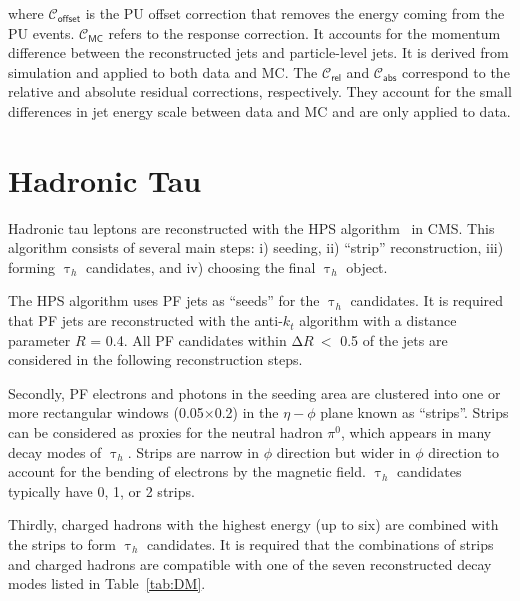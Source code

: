 where $\mathcal{C}_{\textsf{offset}}$ is the \ac{PU} offset correction that removes the energy coming from the \ac{PU} events. $\mathcal{C}_{\textsf{MC}}$ refers to the response correction. It accounts for the momentum difference between the reconstructed jets and particle-level jets. It is derived from simulation and applied to both data and \ac{MC}. The $\mathcal{C}_{\textsf{rel}}$ and $\mathcal{C}_{\textsf{abs}}$ correspond to the relative and absolute residual corrections, respectively. They account for the small differences in jet energy scale between data and \ac{MC} and are only applied to data.

\section{Hadronic Tau}
\label{sec:Tau}

Hadronic tau leptons are reconstructed with the \ac{HPS} algorithm~\cite{CMS:2011eio} in \ac{CMS}. This algorithm consists of several main steps: i) seeding, ii) ``strip'' reconstruction, iii) forming $\uptau_{h}$ candidates, and iv) choosing the final $\uptau_{h}$ object.

The \ac{HPS} algorithm uses \ac{PF} jets as ``seeds'' for the $\uptau_h$ candidates. It is required that \ac{PF} jets are reconstructed with the anti-$k_t$ algorithm with a distance parameter $R$ = 0.4. All \ac{PF} candidates within $\mathrm{\Delta}R~<$ 0.5 of the jets are considered in the following reconstruction steps.

Secondly, \ac{PF} electrons and photons in the seeding area are clustered into one or more rectangular windows (0.05$\times$0.2) in the $\eta-\phi$ plane known as ``strips''. Strips can be considered as proxies for the neutral hadron $\pi^0$, which appears in many decay modes of $\uptau_h$. Strips are narrow in $\phi$ direction but wider in $\phi$ direction to account for the bending of electrons by the magnetic field. $\uptau_h$ candidates typically have 0, 1, or 2 strips. 

Thirdly, charged hadrons with the highest energy (up to six) are combined with the strips to form $\uptau_h$ candidates. It is required that the combinations of strips and charged hadrons are compatible with one of the seven reconstructed decay modes listed in Table~\ref{tab:DM}.

